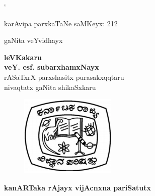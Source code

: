 
`~

\hfill{karAvipa parxkaTaNe saMKeyx: {\rm 212}}

\vfill 

\thispagestyle{empty}
\begin{center}
{\fontsize{30}{32}\selectfont gaNita veYvidhayx}
\vfill


{\Large\bfseries leVKakaru}\\[4pt]
{\LARGE\bfseries veY. esf. subarxhamxNayx}\\[4pt]
{\large rASaTxrX parxshasitx purasakxqqtaru\\[4pt]
nivaqtatx gaNita shikaSxkaru}
\vfill

\begin{figure}[H]
\centering
\includegraphics[scale=.7]{src/figures/logo.eps}
\end{figure}

{\Large\bfseries kanARTaka rAjayx vijAcnxna pariSatutx}





\end{center}

